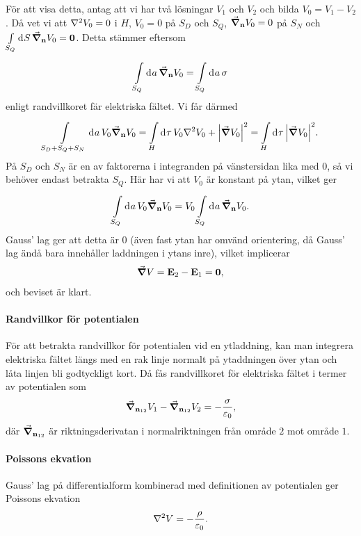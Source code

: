 För att visa detta, antag att vi har två lösningar $V_{1}$ och $V_{2}$ och bilda $V_{0} = V_{1} - V_{2}$. Då vet vi att $\laplacian{V_{0}} = 0$ i $H$, $V_{0} = 0$ på $S_{D}$ och $S_{Q}$, $\grad_{\vb{n}}{V_{0}} = 0$ på $S_{N}$ och $\int\limits_{S_{Q}}^{}\dd[]{S}\grad_{\vb{n}}{V_{0}} = \vb{0}$. Detta stämmer eftersom
\begin{align*}
	\int\limits_{S_{Q}}^{}\dd[]{a}\grad_{\vb{n}}{V_{0}} = \int\limits_{S_{Q}}^{}\dd[]{a}\sigma
\end{align*}
enligt randvillkoret fär elektriska fältet. Vi får därmed
\begin{align*}
	\integ{S_{D} + S_{Q} + S_{N}}{}{a}{V_{0}\grad_{\vb{n}}{V_{0}}} = \integ{H}{}{\tau}{V_{0}\laplacian{V_{0}} + \abs{\grad{V_{0}}}^{2}} = \integ{H}{}{\tau}{\abs{\grad{V_{0}}}^{2}}.
\end{align*}
På $S_{D}$ och $S_{N}$ är en av faktorerna i integranden på vänstersidan lika med $0$, så vi behöver endast betrakta $S_{Q}$. Här har vi att $V_{0}$ är konstant på ytan, vilket ger
\begin{align*}
	\int\limits_{S_{Q}}^{}\dd[]{a}V_{0}\grad_{\vb{n}}{V_{0}} = V_{0}\int\limits_{S_{Q}}^{}\dd[]{a}\grad_{\vb{n}}{V_{0}}.
\end{align*}
Gauss' lag ger att detta är $0$ (även fast ytan har omvänd orientering, då Gauss' lag ändå bara innehåller laddningen i ytans inre), vilket implicerar
\begin{align*}
	\grad{V} = \vb{E}_{2} - \vb{E}_{1} = \vb{0},
\end{align*}
och beviset är klart.

\paragraph{Randvillkor för potentialen}
För att betrakta randvillkor för potentialen vid en ytladdning, kan man integrera elektriska fältet längs med en rak linje normalt på ytaddningen över ytan och låta linjen bli godtyckligt kort. Då fås randvillkoret för elektriska fältet i termer av potentialen som
\begin{align*}
	\grad_{\vb{n}_{12}}V_{1} - \grad_{\vb{n}_{12}}V_{2} = -\frac{\sigma}{\varepsilon_{0}},
\end{align*}
där $\grad_{\vb{n}_{12}}$ är riktningsderivatan i normalriktningen från område $2$ mot område $1$.

\paragraph{Poissons ekvation}
Gauss' lag på differentialform kombinerad med definitionen av potentialen ger Poissons ekvation
\begin{align*}
	\laplacian{V} = -\frac{\rho}{\varepsilon_{0}}.
\end{align*}

